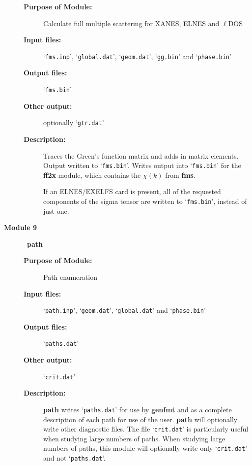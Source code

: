 \documentclass[11pt,oneside]{report} %
\newcommand{\file}[1]{`\texttt{#1}'}
\newcommand{\module}[1]{\textrm{\bf{#1}}}
\begin{document}
\begin{latexonly}
\begin{description}
  \begin{description}
  \item[\textbf{Purpose of Module:}] Calculate full multiple
  scattering for XANES, ELNES and $\ell$DOS
  \item[\textbf{Input files:}] \file{fms.inp}, \file{global.dat},
     \file{geom.dat}, \file{gg.bin} and \file{phase.bin}
  \item[\textbf{Output files:}] \file{fms.bin}
  \item[\textbf{Other output:}] optionally \file{gtr.dat}
  \item[\textbf{Description:}]  Traces the Green's function matrix and adds in
  matrix elements.  Output written to \file{fms.bin}.
    Writes output into \file{fms.bin} for the \module{ff2x} module, which
    contains the $\chi(k)$ from \module{fms}.

    If an ELNES/EXELFS card is present, all of the requested components 
    of the sigma tensor are written to \file{fms.bin}, instead of just one. 
  \end{description}
\item [\large\textbf{Module 9}]\dotfill\  {\large\module{path}}
  \begin{description}
  \item[\textbf{Purpose of Module:}] Path enumeration
  \item[\textbf{Input files:}] \file{path.inp}, \file{geom.dat},
     \file{global.dat} and \file{phase.bin}
  \item[\textbf{Output files:}] \file{paths.dat}
  \item[\textbf{Other output:}] \file{crit.dat}
  \item[\textbf{Description:}] \module{path} writes \file{paths.dat} for use 
    by \module{genfmt} and as a complete description of each path for use of 
    the user. \module{path} will optionally write other diagnostic files. 
    The file \file{crit.dat} is particularly useful when studying 
    large numbers of paths. When studying large numbers of paths, 
    this module will optionally write only \file{crit.dat} and 
    not \file{paths.dat}.


\end{description}
\end{description}
\end{latexonly}
\end{document}
